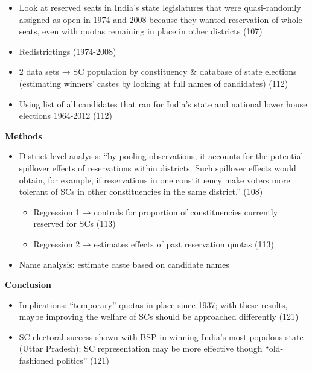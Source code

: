 \documentclass[
  english,
  man]{apa6}
\providecommand{\tightlist}{%
  \setlength{\itemsep}{0pt}\setlength{\parskip}{0pt}}
\begin{document}
\begin{itemize}
\tightlist
\item
  Look at reserved seats in India's state legislatures that were quasi-randomly assigned as open in 1974 and 2008 because they wanted reservation of whole seats, even with quotas remaining in place in other districts (107)
\item
  Redistrictings (1974-2008)
\item
  2 data sets → SC population by constituency \& database of state elections (estimating winners' castes by looking at full names of candidates) (112)
\item
  Using list of all candidates that ran for India's state and national lower house elections 1964-2012 (112)
\end{itemize}

\textbf{Methods}

\begin{itemize}
\tightlist
\item
  District-level analysis: ``by pooling observations, it accounts for the potential spillover effects of reservations within districts. Such spillover effects would obtain, for example, if reservations in one constituency make voters more tolerant of SCs in other constituencies in the same district.'' (108)

  \begin{itemize}
  \tightlist
  \item
    Regression 1 → controls for proportion of constituencies currently reserved for SCs (113)
  \item
    Regression 2 → estimates effects of past reservation quotas (113)
  \end{itemize}
\item
  Name analysis: estimate caste based on candidate names
\end{itemize}

\textbf{Conclusion}

\begin{itemize}
\tightlist
\item
  Implications: ``temporary'' quotas in place since 1937; with these results, maybe improving the welfare of SCs should be approached differently (121)
\item
  SC electoral success shown with BSP in winning India's most populous state (Uttar Pradesh); SC representation may be more effective though ``old-fashioned politics'' (121)
\end{itemize}
\end{document}
